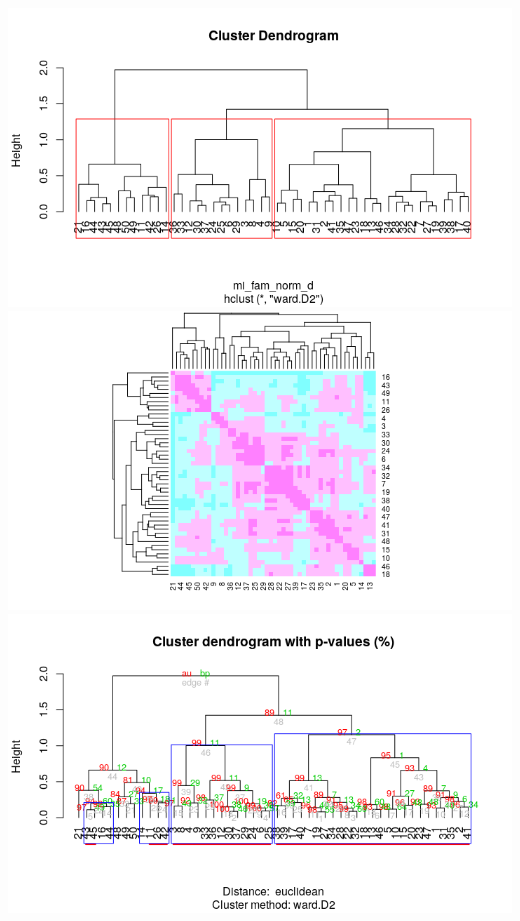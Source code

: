\documentclass[11pt,]{article}
\begin{document}
\includegraphics[width=1.00000\textwidth]{agrupamiento_dendrograma.png}
\includegraphics[width=1.00000\textwidth]{comparacion_dendrograma_mapa_calor.png}
\includegraphics[width=1.00000\textwidth]{agrupamiento_dendrogramas_porcentajes.png}
\end{document}
